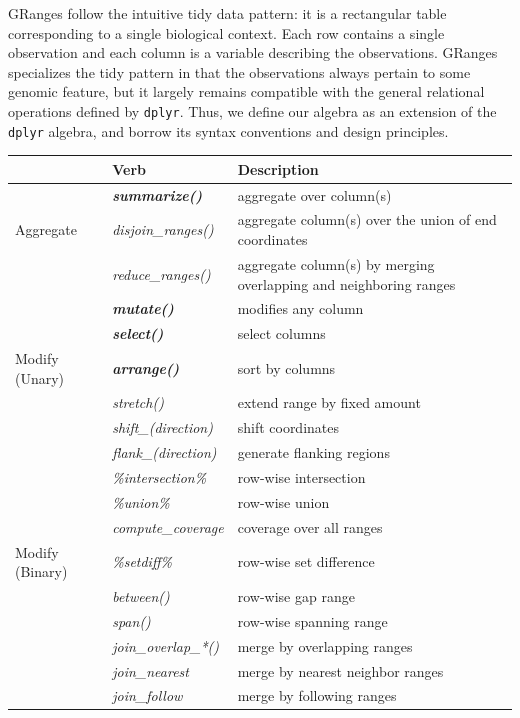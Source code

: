 \documentclass[]{article}
\begin{document}
GRanges follow the intuitive tidy data pattern: it is a rectangular
table corresponding to a single biological context. Each row contains a
single observation and each column is a variable describing the
observations. GRanges specializes the tidy pattern in that the
observations always pertain to some genomic feature, but it largely
remains compatible with the general relational operations defined by
\texttt{dplyr}. Thus, we define our algebra as an extension of the
\texttt{dplyr} algebra, and borrow its syntax conventions and design
principles.

\begin{table}[!htbp]
\centering
\begin{tabular}{|l|l|p{6cm}|}
  \hline
  & Verb &  Description \\ 
  \hline
   & \textbf{\emph{summarize()}} & aggregate over column(s) \\ 
   Aggregate & \emph{disjoin\_ranges()} & aggregate column(s) over the union of end coordinates \\
   &  \emph{reduce\_ranges()} & aggregate column(s) by merging overlapping and neighboring ranges \\
   \hline
   &  \textbf{\emph{mutate()}} & modifies any column \\
   & \textbf{\emph{select()}} & select columns \\
  Modify (Unary) & \textbf{\emph{arrange()}} & sort by columns \\
   & \emph{stretch()} & extend range by fixed amount \\
   &  \emph{shift\_(direction)} & shift coordinates \\
   & \emph{flank\_(direction)} & generate flanking regions \\
   & \emph{\%intersection\% } & row-wise intersection \\
   & \emph{\%union\%} & row-wise union \\
   & \emph{compute\_coverage} & coverage over all ranges \\
  Modify (Binary) &  \emph{\%setdiff\%} & row-wise set difference \\
   & \emph{between()} & row-wise gap range \\
   & \emph{span()} & row-wise spanning range \\
   \hline
    & \emph{join\_overlap\_*()} & merge by overlapping ranges \\
    & \emph{join\_nearest} & merge by nearest neighbor ranges \\
    & \emph{join\_follow} & merge by following ranges \\

\end{tabular}
\end{table}
\end{document}
